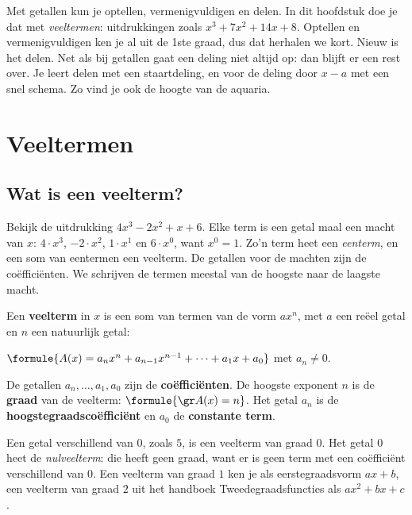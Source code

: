 Met getallen kun je optellen, vermenigvuldigen en delen. In dit hoofdstuk doe je dat met \textit{veeltermen}: uitdrukkingen zoals $x^3 + 7x^2 + 14x + 8$. Optellen en vermenigvuldigen ken je al uit de 1ste graad, dus dat herhalen we kort. Nieuw is het delen. Net als bij getallen gaat een deling niet altijd op: dan blijft er een rest over. Je leert delen met een staartdeling, en voor de deling door $x - a$ met een snel schema. Zo vind je ook de hoogte van de aquaria.

\begin{oefeningen}[Start]

\end{oefeningen}

\section{Veeltermen}

\subsection{Wat is een veelterm?}

Bekijk de uitdrukking $4x^3 - 2x^2 + x + 6$. Elke term is een getal maal een macht van $x$: $4 \cdot x^3$, $-2 \cdot x^2$, $1 \cdot x^1$ en $6 \cdot x^0$, want $x^0 = 1$. Zo'n term heet een \textit{eenterm}, en een som van eentermen een veelterm. De getallen voor de machten zijn de coëfficiënten. We schrijven de termen meestal van de hoogste naar de laagste macht.

\begin{theorie}
Een \textbf{\textcolor{accent}{veelterm}} in $x$ is een som van termen van de vorm $ax^n$, met $a$ een reëel getal en $n$ een natuurlijk getal:

\qquad $\formule{A(x) = a_nx^n + a_{n-1}x^{n-1} + \cdots + a_1x + a_0}$ \qquad met $a_n \neq 0$.

De getallen $a_n, \ldots, a_1, a_0$ zijn de \textbf{\textcolor{accent}{coëfficiënten}}. De hoogste exponent $n$ is de \textbf{\textcolor{accent}{graad}} van de veelterm: $\formule{\gr A(x) = n}$. Het getal $a_n$ is de \textbf{\textcolor{accent}{hoogstegraadscoëfficiënt}} en $a_0$ de \textbf{\textcolor{accent}{constante term}}.
\end{theorie}

Een getal verschillend van $0$, zoals $5$, is een veelterm van graad $0$. Het getal $0$ heet de \textit{nulveelterm}: die heeft geen graad, want er is geen term met een coëfficiënt verschillend van $0$. Een veelterm van graad $1$ ken je als eerstegraadsvorm $ax + b$, een veelterm van graad $2$ uit het handboek Tweedegraadsfuncties als $ax^2 + bx + c$.

